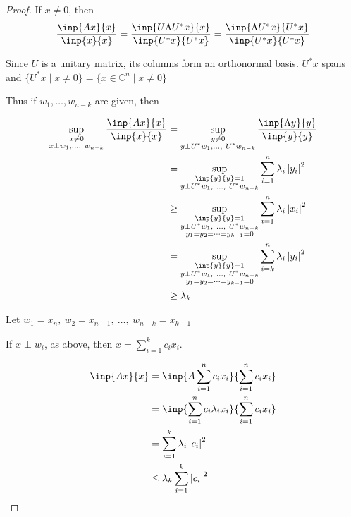 \documentclass[twofold]{article}
\newcommand*\adj[1]{#1^*}
\newcommand*\abs[1]{\left \vert #1 \right\vert}
\theoremstyle{plain}
\theoremstyle{definition}
\theoremstyle{remark}
\begin{document}
\begin{proof} 

 If \(x \neq 0\), then \[\frac{\inp{Ax}{x}}{\inp{x}{x}} = \frac{\inp{U \Lambda \adj{U} x}{x}}{\inp{\adj{U} x}{ \adj{U} x}} =  \frac{\inp{\Lambda \adj{U} x}{ \adj{U} x}}{\inp{\adj{U}x}{\adj{U}x}}\]

Since \(U\) is a unitary matrix, its columns form an orthonormal basis.  \(\adj{U}x\) spans and \( \{ \adj{U} x \mid x \neq 0\}  = \{x \in \mathbb{C}^n \mid x \ne 0 \}\) 



Thus if \(w_1, \ldots , w_{n-k}\) are given, then 

\begin{equation*} \begin{split}
\sup_{\substack{x \neq 0 \\ x \perp w_1, \ldots, \ w_{n-k}}} \frac{\inp{Ax}{x}}{\inp{x}{x}} & = \sup_{\substack{y \neq 0 \\ y \perp \adj{U} w_1, \ldots ,\ \adj{U} w_{n-k}}} \frac{\inp{\Lambda y}{y}}{\inp{y}{y}} \\
&  = \sup_{\substack{\inp{y}{y} = 1 \\ y \perp \adj{U} w_1, \ \ldots , \ \adj{U}w_{n-k}}} \sum_{i = 1}^n \lambda_i \abs{y_i}^2 \\
&  \ge \sup_{\substack{\inp{y}{y} = 1 \\ y \perp \adj{U} w_1, \ \ldots , \ \adj{U} w_{n-k} \\ y_1 = y_2 = \cdots = y_{k-1} = 0 }} \sum_{i = 1}^n \lambda_i \abs{x_i}^2 \\
&  = \sup_{\substack{\inp{y}{y} = 1 \\ y \perp \adj{U} w_1, \ \ldots , \ \adj{U} w_{n-k} \\ y_1 = y_2 = \cdots = y_{k-1} = 0 }} \sum_{i = k}^n \lambda_i \abs{y_i}^2 \\
&  \ge \lambda_k 
\end{split} \end{equation*}


Let \(w_1 = x_n , \ w_2 = x_{n-1}, \ \ldots , \ w_{n-k} = x_{k + 1}\)

If \(x\perp w_i\), as above, then \(x = \sum_{i = 1} ^k c_i x_i\). 

\begin{equation*} \begin{split}
\inp{Ax}{x} & = \inp{A \sum_{i = 1} ^ n c_i x_i}{ \sum_{i = 1} ^n c_i x_i} \\
&  = \inp{\sum_{i = 1} ^n c_i \lambda_i x_i}{\sum_{i = 1} ^n c_i x_i}\\
& = \sum_{i = 1} ^ k \lambda_i \abs{c_i}^2 \\
&  \le \lambda_k \sum_{i = 1} ^{k} \abs{c_i}^2
\end{split} \end{equation*}
\end{proof}
\end{document}
